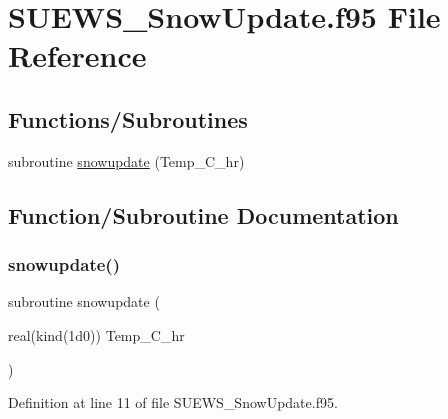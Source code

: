 \hypertarget{_s_u_e_w_s___snow_update_8f95}{}\section{S\+U\+E\+W\+S\+\_\+\+Snow\+Update.\+f95 File Reference}
\label{_s_u_e_w_s___snow_update_8f95}
\subsection*{Functions/\+Subroutines}
\begin{DoxyCompactItemize}
\item 
subroutine \hyperlink{_s_u_e_w_s___snow_update_8f95_a127ff78187a3d6373485550517279a40}{snowupdate} (Temp\+\_\+\+C\+\_\+hr)
\end{DoxyCompactItemize}


\subsection{Function/\+Subroutine Documentation}
\mbox{\label{_s_u_e_w_s___snow_update_8f95_a127ff78187a3d6373485550517279a40}} 
\subsubsection{\texorpdfstring{snowupdate()}{snowupdate()}}
{\footnotesize\ttfamily subroutine snowupdate (\begin{DoxyParamCaption}\item[{real(kind(1d0))}]{Temp\+\_\+\+C\+\_\+hr }\end{DoxyParamCaption})}



Definition at line 11 of file S\+U\+E\+W\+S\+\_\+\+Snow\+Update.\+f95.


